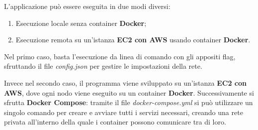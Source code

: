 \documentclass[conference]{IEEEtran}
\begin{document}
L'applicazione può essere eseguita in due modi diversi:
\begin{enumerate}
    \item Esecuzione locale senza container \textbf{Docker};
    \item Esecuzione remota su un'istanza \textbf{EC2 con AWS} usando container \textbf{Docker}.
\end{enumerate}

Nel primo caso, basta l'esecuzione da linea di comando con gli appositi flag, sfruttando il file \textit{config.json} per gestire le impostazioni della rete.

Invece nel secondo caso, il programma viene sviluppato su un'istanza \textbf{EC2 con AWS}, dove ogni nodo viene eseguito su un container \textbf{Docker}.
Successivamente si sfrutta \textbf{Docker Compose}: tramite il file \textit{docker-compose.yml} si può utilizzare un singolo comando per creare e avviare tutti i servizi necessari, creando una rete privata all'interno della quale i container possono comunicare tra di loro.



\end{document}
